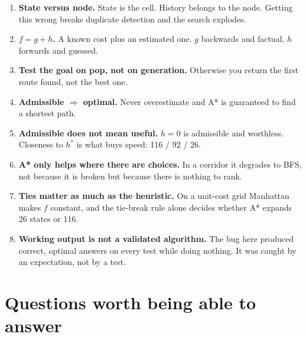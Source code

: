 \documentclass[11pt,a4paper]{article}
\begin{document}
\begin{enumerate}
  \item \textbf{State versus node.} State is the cell. History belongs to the
        node. Getting this wrong breaks duplicate detection and the search
        explodes.

  \item \textbf{$f = g + h$.} A known cost plus an estimated one. $g$ backwards
        and factual, $h$ forwards and guessed.

  \item \textbf{Test the goal on pop, not on generation.} Otherwise you return
        the first route found, not the best one.

  \item \textbf{Admissible $\Rightarrow$ optimal.} Never overestimate and A* is
        guaranteed to find a shortest path.

  \item \textbf{Admissible does not mean useful.} $h=0$ is admissible and
        worthless. Closeness to $h^*$ is what buys speed: 116 / 92 / 26.

  \item \textbf{A* only helps where there are choices.} In a corridor it degrades
        to BFS, not because it is broken but because there is nothing to rank.

  \item \textbf{Ties matter as much as the heuristic.} On a unit-cost grid
        Manhattan makes $f$ constant, and the tie-break rule alone decides whether
        A* expands 26 states or 116.

  \item \textbf{Working output is not a validated algorithm.} The bug here
        produced correct, optimal answers on every test while doing nothing. It
        was caught by an expectation, not by a test.
\end{enumerate}

\section{Questions worth being able to answer}
\end{document}
